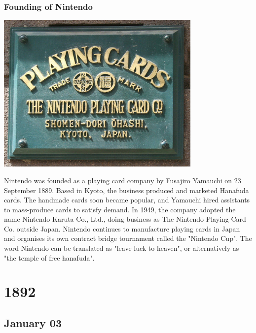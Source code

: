 \documentclass[11pt]{report}
\begin{document}
\subsection{Founding of Nintendo}
\vspace{2mm}\begin{center}\includegraphics[width=10cm]{./img/nintendoFounded.jpg}\end{center}
Nintendo was founded as a playing card company by Fusajiro Yamauchi on 23 September 1889. Based in Kyoto, the business produced and marketed Hanafuda cards. The handmade cards soon became popular, and Yamauchi hired assistants to mass-produce cards to satisfy demand. In 1949, the company adopted the name Nintendo Karuta Co., Ltd., doing business as The Nintendo Playing Card Co. outside Japan. Nintendo continues to manufacture playing cards in Japan and organises its own contract bridge tournament called the "Nintendo Cup". The word Nintendo can be translated as "leave luck to heaven", or alternatively as "the temple of free hanafuda".

\chapter{1892}
\section{January 03}
\end{document}
